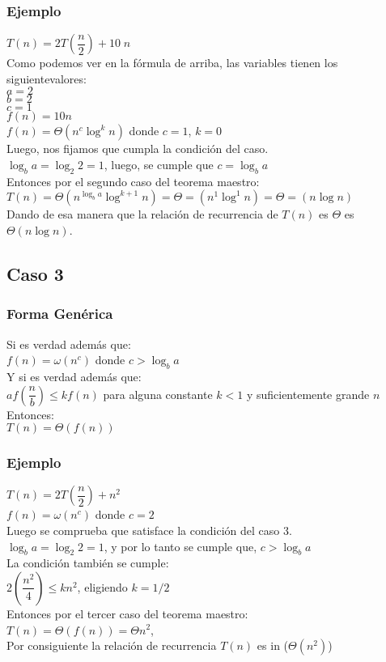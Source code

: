 \documentclass[a4paper,11pt]{article}
\begin{document}
\subsubsection{Ejemplo}
$T(n)=2T(\dfrac{n}{2})+10\;n$\\
Como podemos ver en la fórmula de arriba, las variables tienen los siguientevalores:\\
$a=2$\\$b=2$\\$c=1$\\$f(n)=10n$\\
$f(n)=\Theta(n^{c}\log^{k}n)$ donde $c=1$, $k=0$\\
Luego, nos fijamos que cumpla la condición del caso.\\
$\log_b a = \log_2 2=1$, luego, se cumple que $c=\log_b a$\\
Entonces por el segundo caso del teorema maestro:\\
$T(n)=\Theta(n^{\log_b a}\log^{k+1} n)=\Theta=(n^{1} \log^{1} n)=\Theta=(n\log n)$\\
Dando de esa manera que la relación de recurrencia de $T(n)$ es $\Theta$ es $\Theta (n \log n)$.

\subsection{Caso 3}
\subsubsection{Forma Genérica}\noindent
Si es verdad además que:\\$f(n)=\omega(n^{c})$ donde $c>\log_b a$\\
Y si es verdad además que:\\
$af(\dfrac{n}{b})\leq kf(n)$ para alguna constante $k<1$ y suficientemente grande $n$\\ Entonces:\\
$T(n)=\Theta(f(n))$
\subsubsection{Ejemplo}
$T(n)=2T (\dfrac{n}{2})+n^{2}$\\$f(n)=\omega (n^{c})$ donde $c=2$\\
Luego se comprueba que satisface la condición del caso 3.\\
$\log_b a = \log_2 2 = 1$, y por lo tanto se cumple que, $c>\log_ba$\\
La condición también se cumple:\\ $2 (\dfrac{n^{2}}{4}) \leq kn^{2}$, eligiendo $k=1/2$\\
Entonces por el tercer caso del teorema maestro:\\$T(n)=\Theta(f(n))=\Theta n^{2}$,\\Por consiguiente la relación de recurrencia $T(n)$ es in ($\Theta (n^{2})$)
\end{document}
